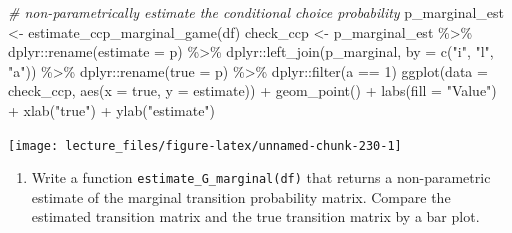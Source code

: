 \documentclass[
]{book}
\newenvironment{Shaded}{\begin{snugshade}}{\end{snugshade}}
\newcommand{\AttributeTok}[1]{\textcolor[rgb]{0.77,0.63,0.00}{#1}}
\newcommand{\CommentTok}[1]{\textcolor[rgb]{0.56,0.35,0.01}{\textit{#1}}}
\newcommand{\DecValTok}[1]{\textcolor[rgb]{0.00,0.00,0.81}{#1}}
\newcommand{\FunctionTok}[1]{\textcolor[rgb]{0.00,0.00,0.00}{#1}}
\newcommand{\NormalTok}[1]{#1}
\newcommand{\OtherTok}[1]{\textcolor[rgb]{0.56,0.35,0.01}{#1}}
\newcommand{\SpecialCharTok}[1]{\textcolor[rgb]{0.00,0.00,0.00}{#1}}
\newcommand{\StringTok}[1]{\textcolor[rgb]{0.31,0.60,0.02}{#1}}
\providecommand{\tightlist}{%
  \setlength{\itemsep}{0pt}\setlength{\parskip}{0pt}}
\begin{document}
\begin{Shaded}
\begin{Highlighting}[]
\CommentTok{\# non{-}parametrically estimate the conditional choice probability}
\NormalTok{p\_marginal\_est }\OtherTok{\textless{}{-}} \FunctionTok{estimate\_ccp\_marginal\_game}\NormalTok{(df)}
\NormalTok{check\_ccp }\OtherTok{\textless{}{-}}\NormalTok{ p\_marginal\_est }\SpecialCharTok{\%\textgreater{}\%}
\NormalTok{  dplyr}\SpecialCharTok{::}\FunctionTok{rename}\NormalTok{(}\AttributeTok{estimate =}\NormalTok{ p) }\SpecialCharTok{\%\textgreater{}\%}
\NormalTok{  dplyr}\SpecialCharTok{::}\FunctionTok{left\_join}\NormalTok{(p\_marginal, }\AttributeTok{by =} \FunctionTok{c}\NormalTok{(}\StringTok{"i"}\NormalTok{, }\StringTok{"l"}\NormalTok{, }\StringTok{"a"}\NormalTok{)) }\SpecialCharTok{\%\textgreater{}\%}
\NormalTok{  dplyr}\SpecialCharTok{::}\FunctionTok{rename}\NormalTok{(}\AttributeTok{true =}\NormalTok{ p) }\SpecialCharTok{\%\textgreater{}\%}
\NormalTok{  dplyr}\SpecialCharTok{::}\FunctionTok{filter}\NormalTok{(a }\SpecialCharTok{==} \DecValTok{1}\NormalTok{)}
\FunctionTok{ggplot}\NormalTok{(}\AttributeTok{data =}\NormalTok{ check\_ccp, }\FunctionTok{aes}\NormalTok{(}\AttributeTok{x =}\NormalTok{ true, }\AttributeTok{y =}\NormalTok{ estimate)) }\SpecialCharTok{+}
  \FunctionTok{geom\_point}\NormalTok{() }\SpecialCharTok{+}
  \FunctionTok{labs}\NormalTok{(}\AttributeTok{fill =} \StringTok{"Value"}\NormalTok{) }\SpecialCharTok{+} \FunctionTok{xlab}\NormalTok{(}\StringTok{"true"}\NormalTok{) }\SpecialCharTok{+} \FunctionTok{ylab}\NormalTok{(}\StringTok{"estimate"}\NormalTok{)}
\end{Highlighting}
\end{Shaded}

\begin{center}\texttt{[image: lecture\_files/figure-latex/unnamed-chunk-230-1]} \end{center}

\begin{enumerate}
\def\labelenumi{\arabic{enumi}.}
\setcounter{enumi}{14}
\tightlist
\item
  Write a function \texttt{estimate\_G\_marginal(df)} that returns a non-parametric estimate of the marginal transition probability matrix. Compare the estimated transition matrix and the true transition matrix by a bar plot.
\end{enumerate}
\end{document}
